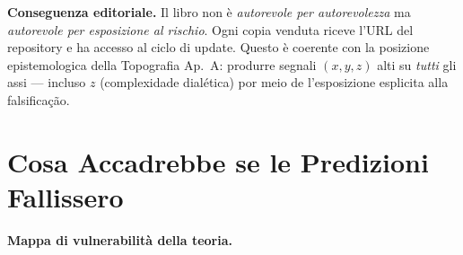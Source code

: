 \Proved{} \textbf{Conseguenza editoriale.} Il libro non è
\emph{autorevole per autorevolezza} ma \emph{autorevole per esposizione
al rischio}. Ogni copia venduta riceve l'URL del repository e ha accesso
al ciclo di update. Questo è coerente con la posizione epistemologica
della Topografia Ap.~A: produrre segnali \((x, y, z)\) alti su
\emph{tutti} gli assi --- incluso \(z\) (complexidade dialética) por meio de
l'esposizione esplicita alla falsificação.



\section{Cosa Accadrebbe se le Predizioni
Fallissero}\label{cosa-accadrebbe-se-le-predizioni-fallissero}

\Hypoth{} \textbf{Mappa di vulnerabilità della teoria.}

